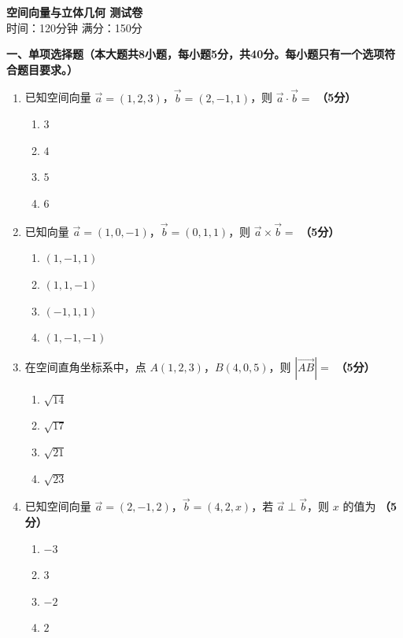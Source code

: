 \documentclass[12pt, a4paper]{ctexart}
\newcommand{\score}[1]{\hfill\textbf{（#1分）}}
\begin{document}
\begin{center}
{\Large\bfseries 空间向量与立体几何 测试卷}\\[0.5em]
{\normalsize 时间：120分钟 \quad 满分：150分}
\end{center}

\vspace{1em}

\noindent\textbf{一、单项选择题（本大题共8小题，每小题5分，共40分。每小题只有一个选项符合题目要求。）}

\vspace{0.5em}

\begin{enumerate}
\item 已知空间向量 $\vec{a}=(1,2,3)$，$\vec{b}=(2,-1,1)$，则 $\vec{a}\cdot\vec{b}=$ \score{5}
\begin{enumerate}[label=\Alph*.]
\item $3$
\item $4$
\item $5$
\item $6$
\end{enumerate}

\item 已知向量 $\vec{a}=(1,0,-1)$，$\vec{b}=(0,1,1)$，则 $\vec{a}\times\vec{b}=$ \score{5}
\begin{enumerate}[label=\Alph*.]
\item $(1,-1,1)$
\item $(1,1,-1)$
\item $(-1,1,1)$
\item $(1,-1,-1)$
\end{enumerate}

\item 在空间直角坐标系中，点 $A(1,2,3)$，$B(4,0,5)$，则 $|\overrightarrow{AB}|=$ \score{5}
\begin{enumerate}[label=\Alph*.]
\item $\sqrt{14}$
\item $\sqrt{17}$
\item $\sqrt{21}$
\item $\sqrt{23}$
\end{enumerate}

\item 已知空间向量 $\vec{a}=(2,-1,2)$，$\vec{b}=(4,2,x)$，若 $\vec{a}\perp\vec{b}$，则 $x$ 的值为 \score{5}
\begin{enumerate}[label=\Alph*.]
\item $-3$
\item $3$
\item $-2$
\item $2$
\end{enumerate}


\end{enumerate}
\end{document}
